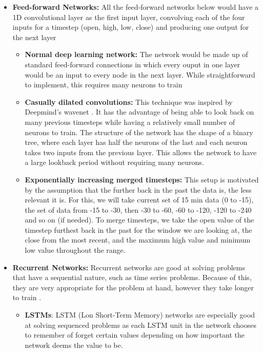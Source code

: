         \begin{itemize}

            \item \textbf{Feed-forward Networks:} All the feed-forward networks below would have a 1D convolutional layer as the first input layer, convolving each of the four inputs for a timestep (open, high, low, close) and producing one output for the next layer

            \begin{itemize}
                    
                \item \textbf{Normal deep learning network:} The network would be made up of standard feed-forward connections in which every ouput in one layer would be an input to every node in the next layer. While straightforward to implement, this requires many neurons to train 

                \item \textbf{Casually dilated convolutions:} This technique was inspired by Deepmind's wavenet \cite{deepmind}. It has the advantage of being able to look back on many previous timesteps while having a relatively small number of neurons to train. The structure of the network has the shape of a binary tree, where each layer has half the neurons of the last and each neuron takes two inputs from the previous layer. This allows the network to have a large lookback period without requiring many neurons.
            
                \item \textbf{Exponentially increasing merged timesteps:} This setup is motivated by the assumption that the further back in the past the data is, the less relevant it is. For this, we will take current set of 15 min data (0 to -15), the set of data from -15 to -30, then -30 to -60, -60 to -120, -120 to -240 and so on (if needed). To merge timesteps, we take the open value of the timestep furthest back in the past for the window we are looking at, the close from the most recent, and the maximum high value and minimum low value throughout the range. 
            
            \end{itemize}

            \item \textbf{Recurrent Networks:} Recurrent networks are good at solving problems that have a sequential nature, such as time series problems. Because of this, they are very appropriate for the problem at hand, however they take longer to train \cite{deepmind}.
            
            \begin{itemize}

                \item \textbf{LSTMs}: LSTM (Lon Short-Term Memory) networks are especially good at solving sequenced problems as each LSTM unit in the network chooses to remember of forget certain values depending on how important the network deems the value to be.
                
            \end{itemize}

        \end{itemize}

